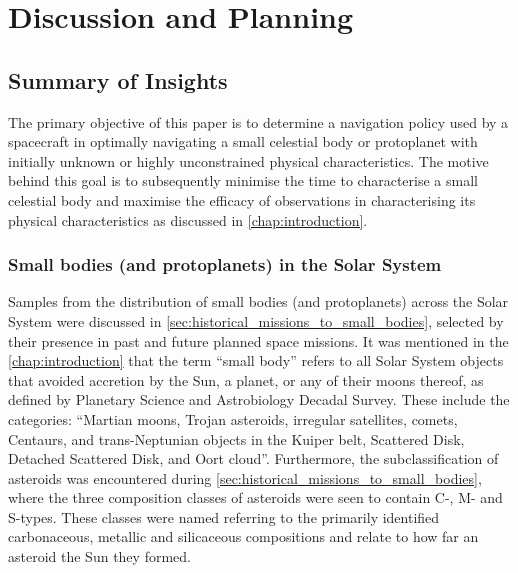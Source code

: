 \chapter{Discussion and Planning}

\section{Summary of Insights}
The primary objective of this paper is to determine a navigation policy used by a spacecraft in optimally navigating a small celestial body or protoplanet with initially unknown or highly unconstrained physical characteristics. The motive behind this goal is to subsequently minimise the time to characterise a small celestial body and maximise the efficacy of observations in characterising its physical characteristics as discussed in \autoref{chap:introduction}.

\subsection{Small bodies (and protoplanets) in the Solar System}\label{ssec:insight:small-bodies}

Samples from the distribution of small bodies (and protoplanets) across the Solar System were discussed in \autoref{sec:historical_missions_to_small_bodies}, selected by their presence in past and future planned space missions. It was mentioned in the \autoref{chap:introduction} that the term ``small body'' refers to all Solar System objects that avoided accretion by the Sun, a planet, or any of their moons thereof, as defined by Planetary Science and Astrobiology Decadal Survey. These include the categories: ``Martian moons, Trojan asteroids, irregular satellites, comets, Centaurs, and trans-Neptunian objects in the Kuiper belt, Scattered Disk, Detached Scattered Disk, and Oort cloud''. Furthermore, the subclassification of asteroids was encountered during \autoref{sec:historical_missions_to_small_bodies}, where the three composition classes of asteroids were seen to contain C-, M- and S-types. These classes were named referring to the primarily identified carbonaceous, metallic and silicaceous compositions and relate to how far an asteroid the Sun they formed. 


